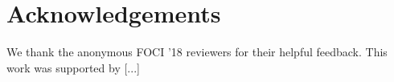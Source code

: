 
\section*{Acknowledgements}
We thank the anonymous FOCI '18 reviewers for their helpful
feedback. This work was supported by [...]